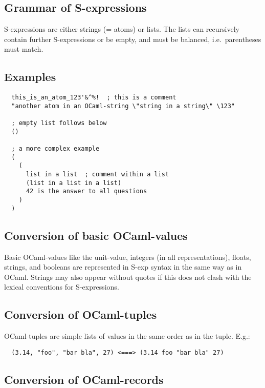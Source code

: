 \documentclass[a4paper]{article}
\begin{document}
\subsection{Grammar of S-expressions}

S-expressions are either strings (= atoms) or lists. The lists can
recursively contain further S-expressions or be empty, and must be
balanced, i.e.\ parentheses must match.

\subsection{Examples}

{\samepage
\begin{verbatim}
  this_is_an_atom_123'&^%!  ; this is a comment
  "another atom in an OCaml-string \"string in a string\" \123"

  ; empty list follows below
  ()

  ; a more complex example
  (
    (
      list in a list  ; comment within a list
      (list in a list in a list)
      42 is the answer to all questions
    )
  )
\end{verbatim}
}

\subsection{Conversion of basic OCaml-values}

Basic OCaml-values like the unit-value, integers (in all representations),
floats, strings, and booleans are represented in S-exp syntax in the
same way as in OCaml.  Strings may also appear without quotes if this
does not clash with the lexical conventions for S-expressions.

\subsection{Conversion of OCaml-tuples}

OCaml-tuples are simple lists of values in the same order as in the tuple.
E.g.:

\begin{verbatim}
  (3.14, "foo", "bar bla", 27) <===> (3.14 foo "bar bla" 27)
\end{verbatim}

\subsection{Conversion of OCaml-records}
\end{document}
